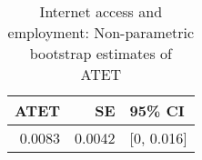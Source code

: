 \begin{table}[!h]
\centering
\caption{\label{tab:tab:np_atet}Internet access and employment: Non-parametric bootstrap estimates of ATET}
\centering
\begin{tabular}[t]{rrl}
\toprule
ATET & SE & 95\% CI\\
\midrule
0.0083 & 0.0042 & {}[0, 0.016]\\
\bottomrule
\end{tabular}
\end{table}
